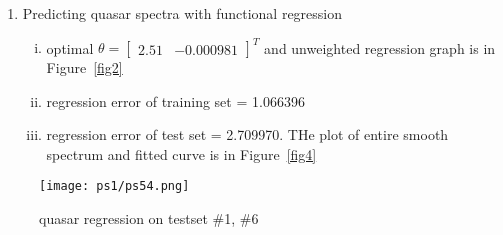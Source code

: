 \documentclass[11pt]{article}
\newcommand{\rvect}[1]{\begin{bmatrix} #1 \end{bmatrix}}
\begin{document}
\begin{enumerate}
\item Predicting quasar spectra with functional regression\\
  \begin{enumerate}[i.]
  \item optimal $\theta = \rvect{2.51 &-0.000981}^T$ and unweighted regression graph is in Figure~\ref{fig2}
  \item regression error of training set = 1.066396
  \item regression error of test set = 2.709970. THe plot of entire smooth spectrum and fitted curve is in Figure~\ref{fig4}
  \end{enumerate}
\end{enumerate}
\begin{figure}[!htbp]
  \begin{center}
    \texttt{[image: ps1/ps54.png]}
    \caption{quasar regression on testset \#1, \#6}\label{fig5}
  \end{center}
\end{figure}
\end{document}
